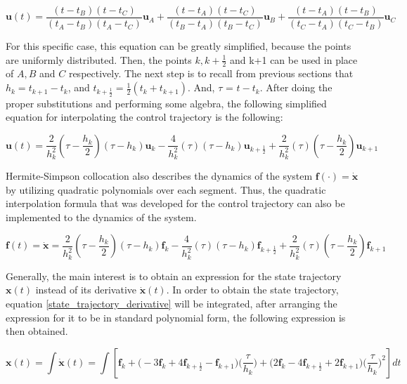 \documentclass{thesisreport}
\begin{document}
\begin{equation}
\bm{u}(t) = \frac{(t-t_B)(t-t_C)}{(t_A-t_B)(t_A-t_C)}\bm{u}_A + 
\frac{(t-t_A)(t-t_C)}{(t_B-t_A)(t_B-t_C)}\bm{u}_B + 
\frac{(t-t_A)(t-t_B)}{(t_C-t_A)(t_C-t_B)}\bm{u}_C
\end{equation}

For this specific case, this equation can be greatly simplified, because the points are uniformly distributed.
Then, the points $k, k+\frac{1}{2}$ and k+1 can be used in place of $A,B$ and $C$ respectively. The next step is to recall from previous sections that $h_k = t_{k+1}-t_k$, and  $t_{k + \frac{1}{2}}=\frac{1}{2}(t_k + t_{k+1})$. And, $\tau$ = $t-t_k$. After doing the proper substitutions and performing some algebra, the following simplified equation for interpolating the control trajectory is the following:

\begin{equation}
	\bm{u}(t) = \frac{2}{h_k^2} (\tau - \frac{h_k}{2})(\tau - h_k)\bm{u}_k - \frac{4}{h_k^2}(\tau)(\tau - h_k)\bm{u}_{k+\frac{1}{2}} + \frac{2}{h_k^2}(\tau)(\tau-\frac{h_k}{2})\bm{u}_{k+1} 
\end{equation}

Hermite-Simpson collocation also describes the dynamics of the system $\bm{f}(\cdot)=\dot{\bm{x}}$ by utilizing quadratic polynomials over each segment. Thus, the quadratic interpolation formula that was developed for the control trajectory can also be implemented to the dynamics of the system.

\begin{equation}\label{state_trajectory_derivative}
	\bm{f}(t) = \dot{\bm{x}} = \frac{2}{h_k^2} (\tau - \frac{h_k}{2})(\tau - h_k)\bm{f}_k - \frac{4}{h_k^2}(\tau)(\tau - h_k)\bm{f}_{k+\frac{1}{2}} + \frac{2}{h_k^2}(\tau)(\tau-\frac{h_k}{2})\bm{f}_{k+1} 
\end{equation}

Generally, the main interest is to obtain an expression for the state trajectory $\bm{x}(t)$ instead of its derivative $\dot{\bm{x}}(t)$. In order to obtain the state trajectory, equation \ref{state_trajectory_derivative} will be integrated, after arranging the expression for it to be in standard polynomial form, the following expression is then obtained.

\begin{equation}
	\bm{x}(t)=\int \dot{\bm{x}}(t)=\int \left[ \bm{f}_k + \bigg(-3 \bm{f}_k + 4 \bm{f}_{k + \frac{1}{2}} -\bm{f}_{k+1}\bigg) \bigg( \frac{\tau}{h_k}\bigg) + \bigg( 2 \bm{f}_k -4 \bm{f}_{k+ \frac{1}{2}} + 2 \bm{f}_{k+1}\bigg)\bigg(\frac{\tau}{h_k}\bigg)^2 \right]dt
\end{equation}
\end{document}
